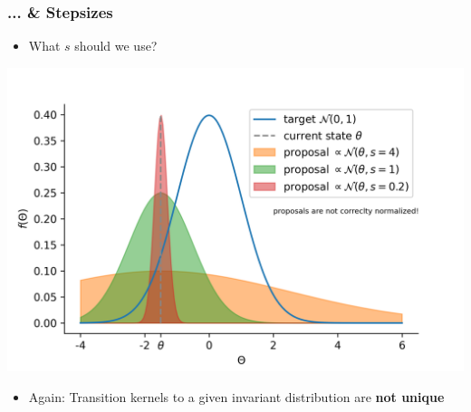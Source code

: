 \begin{frame}[c]
    \frametitle{... \& Stepsizes}
    \begin{itemize}
        \item What $s$ should we use?
    \end{itemize}
    \vspace{-.8cm}
    \begin{center}
        \includegraphics[scale=0.6]{imgs/stepsizes.png}
    \end{center}
    \vspace{-.5cm}
    \begin{itemize}
        \item Again: Transition kernels to a given invariant distribution are \textbf{not unique}
    \end{itemize}
\end{frame}

